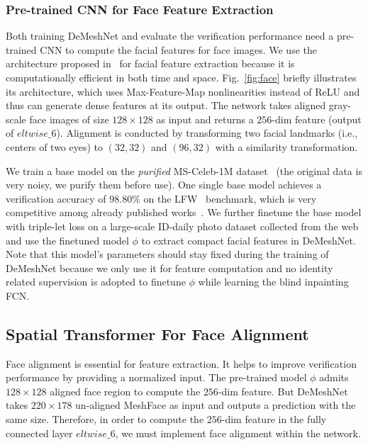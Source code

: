 \documentclass[10pt,twocolumn,letterpaper]{article}
\begin{document}
\subsubsection{Pre-trained CNN for Face Feature Extraction} Both training DeMeshNet and evaluate the verification performance need a pre-trained CNN to compute the facial features for face images. We use the architecture proposed in~\cite{wu2015lightened} for facial feature extraction because it is computationally efficient in both time and space. Fig.~\ref{fig:face} briefly illustrates its architecture, which uses Max-Feature-Map nonlinearities instead of ReLU and thus can generate dense features at its output. The network takes aligned gray-scale face images of size $128 \times 128$ as input and returns a $256$-dim feature (output of $eltwise\_6$). Alignment is conducted by transforming two facial landmarks (i.e., centers of two eyes) to $(32,32)$ and $(96,32)$ with a similarity transformation.



We train a base model on the \textit{purified} MS-Celeb-1M dataset~\cite{guo2016ms} (the original data is very noisy, we purify them before use). One single base model achieves a verification accuracy of $98.80\%$ on the LFW~\cite{LFWTech} benchmark, which is very competitive among already published works~\cite{ding2015robust,wang2015face}. We further finetune the base model with triple-let loss on a large-scale ID-daily photo dataset collected from the web and use the finetuned model $\phi$ to extract compact facial features in DeMeshNet. Note that this model's parameters should stay fixed during the training of DeMeshNet because we only use it for feature computation and no identity related supervision is adopted to finetune $\phi$ while learning the blind inpainting FCN.






\subsection{Spatial Transformer For Face Alignment} Face alignment is essential for feature extraction. It helps to improve verification performance by providing a normalized input. The pre-trained model $\phi$ admits $128\times 128$ aligned face region to compute the $256$-dim feature. But DeMeshNet takes $220\times 178$ un-aligned MeshFace as input and outputs a prediction with the same size. Therefore, in order to compute the $256$-dim feature in the fully connected layer $eltwise\_6$, we must implement face alignment within the network.
\end{document}
